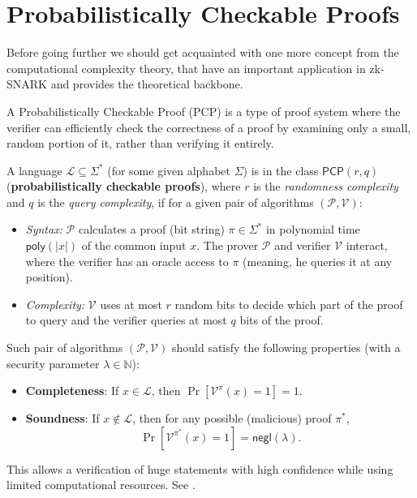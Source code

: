 \documentclass[../lecture-notes.tex]{subfiles}
\begin{document}
\section{Probabilistically Checkable Proofs}

Before going further we should get acquainted with one more concept from the computational 
complexity theory, that have an important application in zk-SNARK and provides the theoretical 
backbone. 

A Probabilistically Checkable Proof (PCP) is a type of proof system where the verifier can 
efficiently check the correctness of a proof by examining only a small, random portion of it, rather
than verifying it entirely. 
\begin{definition}
    A language $\mathcal{L} \subseteq \Sigma^*$ (for some given alphabet $\Sigma$) is in the class $\mathsf{PCP}(r,q)$ (\textbf{probabilistically checkable proofs}), 
    where $r$ is the \emph{randomness complexity} and $q$ is the \emph{query complexity}, 
    if for a given pair of algorithms $(\mathcal{P}, \mathcal{V})$: 
    \begin{itemize}
        \item \emph{Syntax:} $\mathcal{P}$ calculates a proof (bit string) $\pi \in \Sigma^*$ in polynomial time $\mathsf{poly}(|x|)$ of the common input $x$. The prover $\mathcal{P}$ and verifier $\mathcal{V}$ interact, where the verifier has an oracle access to $\pi$ (meaning, he queries it at any position).
        \item \emph{Complexity:} $\mathcal{V}$ uses at most $r$ random bits to decide which part of the proof to 
        query and the verifier queries at most $q$ bits of the proof.
    \end{itemize}
    
    Such pair of algorithms $(\mathcal{P}, \mathcal{V})$ should satisfy the following properties (with a security parameter $\lambda \in \mathbb{N}$):
    \begin{itemize}
        \item \textbf{Completeness}: If $x \in \mathcal{L}$, then $\Pr[\mathcal{V}^{\pi}(x) = 1] = 1$.
        \item \textbf{Soundness}: If $x \notin \mathcal{L}$, then for any possible (malicious) proof $\pi^*$, 
        \begin{equation*}
            \Pr[\mathcal{V}^{\pi^*}(x) = 1] = \mathsf{negl}(\lambda).
        \end{equation*}
    \end{itemize}
\end{definition}
This allows a verification of huge statements with high confidence while using limited computational
resources. See .
\end{document}
